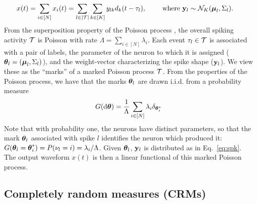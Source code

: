 \begin{align}
  x(t) &= \sum_{i \in [N]} x_{i}(t) =   \sum_{l \in |\mc{T}|} \sum_{k \in [K]} y_{lk} d_k(t - \tau_{l}), \qquad %
  \text{ where } \by_{l}  \sim \mc{N}_K(\mb{\mu}_{l}, \Sigma_{l}). \label{eq:spk}
\end{align}
% 
From the superposition property of the Poisson process \citep{kingman93}, the overall spiking activity $\mathcal{T}$ is 
Poisson with rate $\Lambda = \sum_{i \in [N]} \lambda_i$. Each event $\tau_l \in \mathcal{T}$ is associated with a pair of labels, the parameter of the neuron to which it 
is assigned ($\boldsymbol{\theta}_l = (\boldsymbol{\mu}_l, \Sigma_l)$), and the weight-vector characterizing the spike shape ($\mathbf{y}_l$). We view these as the ``marks'' of a 
marked Poisson process $\mathcal{T}$.  From the properties of the Poisson process, we have that the marks $\boldsymbol{\theta}_l$ are drawn i.i.d. from a probability measure 
\vspace{-.08in}
\begin{align}
 G(\mathrm{d} \boldsymbol{\theta}) = \frac{1}{\Lambda}\sum_{i \in [N]} \lambda_i \delta_{\boldsymbol{\theta}^*_i}    \label{eq:mark_distr}
\end{align}
Note that with probability one, the neurons have distinct parameters, so that the mark $\boldsymbol{\theta}_l$ associated with spike $l$ identifies the
neuron which produced it: $G(\boldsymbol{\theta}_l = \boldsymbol{\theta}^*_i) = P(\nu_l= i) = \lambda_i/\Lambda$. Given $\boldsymbol{\theta}_l$, $\mathbf{y}_l$ is distributed as in
Eq.~\eqref{eq:spk}. The output waveform $x(t)$ is then a linear functional of this marked Poisson process. %

\vspace{-.1in}
\subsection{Completely random measures (CRMs)}


